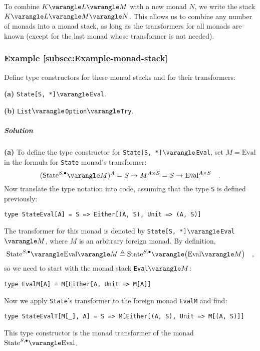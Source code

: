 To combine $K\varangle L\varangle M$ with a new monad $N$, we write
the stack $K\varangle L\varangle M\varangle N$. This allows us to
combine any number of monads into a monad stack, as long as the transformers
for all monads are known (except for the last monad whose transformer
is not needed).

\subsubsection{Example \label{subsec:Example-monad-stack}\ref{subsec:Example-monad-stack}}

Define type constructors for these monad stacks and for their transformers:

\textbf{(a)} \lstinline!State[S, *]!$\varangle$\lstinline!Eval!. 

\textbf{(b)} \lstinline!List!$\varangle$\lstinline!Option!$\varangle$\lstinline!Try!.

\subparagraph{Solution}

\textbf{(a)} To define the type constructor for \lstinline!State[S, *]!$\varangle$\lstinline!Eval!,
set $M=\text{Eval}$ in the formula for \lstinline!State! monad\textsf{'}s
transformer:
\[
(\text{State}^{S,\bullet}\varangle M)^{A}=S\rightarrow M^{A\times S}=S\rightarrow\text{Eval}^{A\times S}\quad.
\]
Now translate the type notation into code, assuming that the type
\lstinline!S! is defined previously:
\begin{lstlisting}
type StateEval[A] = S => Either[(A, S), Unit => (A, S)]
\end{lstlisting}

The transformer for this monad is denoted by \lstinline!State[S, *]!$\varangle$\lstinline!Eval!$\varangle M$,
where $M$ is an arbitrary foreign monad. By definition, 
\[
\text{State}^{S,\bullet}\varangle\text{Eval}\varangle M\triangleq\text{State}^{S,\bullet}\varangle\big(\text{Eval}\varangle M\big)\quad,
\]
so we need to start with the monad stack \lstinline!Eval!$\varangle M$:
\begin{lstlisting}
type EvalM[A] = M[Either[A, Unit => M[A]]
\end{lstlisting}
Now we apply \lstinline!State!\textsf{'}s transformer to the foreign monad
\lstinline!EvalM! and find:
\begin{lstlisting}
type StateEvalT[M[_], A] = S => M[Either[(A, S), Unit => M[(A, S)]]
\end{lstlisting}
This type constructor is the monad transformer of the monad $\text{State}^{S,\bullet}\varangle\text{Eval}$.

